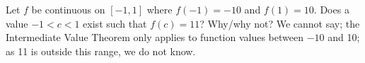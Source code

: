 {Let $f$ be continuous on $[-1,1]$ where $f(-1) = -10$ and $f(1) = 10$. Does a value $-1<c<1$ exist such that $f(c) = 11$? Why/why not?
}
{We cannot say; the Intermediate Value Theorem only applies to function values between $-10$ and 10; as 11 is outside this range, we do not know.
}
